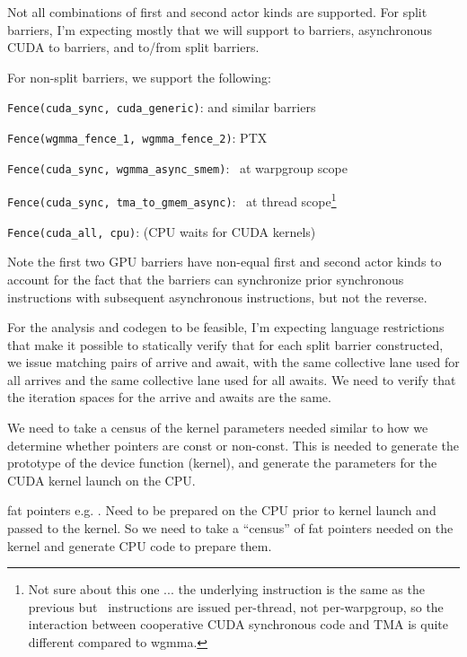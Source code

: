 \filbreak
Not all combinations of first and second actor kinds are supported.
For split barriers, I'm expecting mostly that we will support  to  barriers, asynchronous CUDA to  barriers, and  to/from  split barriers.

\filbreak
For non-split barriers, we support the following:

\texttt{Fence(cuda\_sync, cuda\_generic)}:  and similar barriers

\texttt{Fence(wgmma\_fence\_1, wgmma\_fence\_2)}: PTX \wgmmaFence

\texttt{Fence(cuda\_sync, wgmma\_async\_smem)}: \fenceProxyAsync\ at warpgroup scope

\texttt{Fence(cuda\_sync, tma\_to\_gmem\_async)}: \fenceProxyAsync\ at thread scope\footnote{Not sure about this one ... the underlying instruction is the same as the previous but \cpAsyncBulk\ instructions are issued per-thread, not per-warpgroup, so the interaction between cooperative CUDA synchronous code and TMA is quite different compared to wgmma.}

\texttt{Fence(cuda\_all, cpu)}:  (CPU waits for CUDA kernels)

\filbreak
Note the first two GPU barriers have non-equal first and second actor kinds to account for the fact that the barriers can synchronize prior synchronous instructions with subsequent asynchronous instructions, but not the reverse.

\filbreak
{} For the analysis and codegen to be feasible, I'm expecting language restrictions that make it possible to statically verify that for each split barrier constructed, we issue matching pairs of arrive and await, with the same collective lane used for all arrives and the same collective lane used for all awaits.
We need to verify that the iteration spaces for the arrive and awaits are the same.

\filbreak
{} We need to take a census of the kernel parameters needed similar to how we determine whether pointers are const or non-const.
This is needed to generate the prototype of the device function (kernel), and generate the parameters for the CUDA kernel launch on the CPU.

\filbreak
{} fat pointers e.g. .
Need to be prepared on the CPU prior to kernel launch and passed to the kernel.
So we need to take a ``census'' of fat pointers needed on the kernel and generate CPU code to prepare them.

